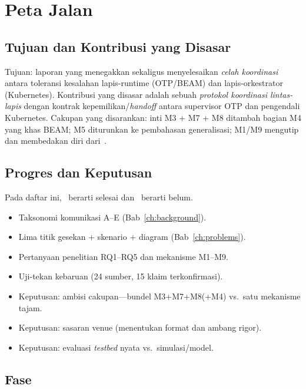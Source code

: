 \chapter{Peta Jalan}
\label{ch:roadmap}

\section{Tujuan dan Kontribusi yang Disasar}
Tujuan: laporan yang menegakkan sekaligus menyelesaikan \emph{celah koordinasi} antara
toleransi kesalahan lapis-runtime (OTP/BEAM) dan lapis-orkestrator (Kubernetes).
Kontribusi yang disasar adalah sebuah \emph{protokol koordinasi lintas-lapis} dengan
kontrak kepemilikan/\emph{handoff} antara supervisor OTP dan pengendali Kubernetes.
Cakupan yang disarankan: inti M3 + M7 + M8 ditambah bagian M4 yang khas BEAM; M5
diturunkan ke pembahasan generalisasi; M1/M9 mengutip dan membedakan diri
dari~\cite{roberts2025}.

\section{Progres dan Keputusan}
Pada daftar ini, \cbdone\ berarti selesai dan \cbtodo\ berarti belum.
\begin{itemize}[leftmargin=2.2em,nosep]
  \item[\cbdone] Taksonomi komunikasi A--E (Bab~\ref{ch:background}).
  \item[\cbdone] Lima titik gesekan + skenario + diagram (Bab~\ref{ch:problems}).
  \item[\cbdone] Pertanyaan penelitian RQ1--RQ5 dan mekanisme M1--M9.
  \item[\cbdone] Uji-tekan kebaruan (24 sumber, 15 klaim terkonfirmasi).
  \item[\cbtodo] Keputusan: ambisi cakupan---bundel M3+M7+M8(+M4) vs.\ satu mekanisme tajam.
  \item[\cbtodo] Keputusan: sasaran venue (menentukan format dan ambang rigor).
  \item[\cbtodo] Keputusan: evaluasi \emph{testbed} nyata vs.\ simulasi/model.
\end{itemize}

\section{Fase}


